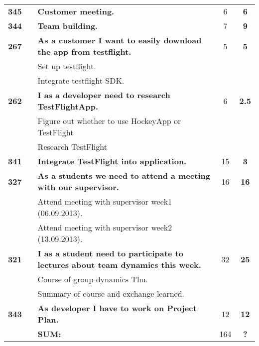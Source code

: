 \begin{longtable}{ccXcc}
		
\midrule
				

\textbf{345} 	&& {\bf Customer meeting.} 	& 		6	& \textbf{6} \\

\textbf{344} 	&& {\bf Team building.} 	& 		7	& \textbf{9} \\
				
			
\textbf{267} 	&& {\bf As a customer I want to easily download the app from testflight. } 	& 		5	& \textbf{5} \\
				&& Set up testflight.	&  &  \\
				&& Integrate testflight SDK. &  &  \\

\textbf{262} 	&& {\bf I as a developer need to research TestFlightApp. } 	& 		6	& \textbf{2.5} \\
				&& Figure out whether to use HockeyApp or TestFlight&  &  \\
				&& Research TestFlight	&  &  \\

\textbf{341} 	&& {\bf Integrate TestFlight into application. } 	& 		15	& \textbf{3} \\

		
\textbf{327} 	&& {\bf As a students we need to attend a meeting with our supervisor. } 	& 		16	& \textbf{16} \\
				&& Attend meeting with supervisor week1 (06.09.2013).	&  &  \\
				&& Attend meeting with supervisor week2 (13.09.2013).	&  &  \\

\midrule
\textbf{321} 	&& {\bf I as a student need to participate to lectures about team dynamics this week. } 	& 		32	& \textbf{25} \\
				&& Course of group dynamics Thu.	&  &  \\
				&& Summary of course and exchange learned.	&  &  \\
				
\textbf{343} 	&& {\bf As developer I have to work on Project Plan.} 	& 		12	& \textbf{12} \\
				
\hline
				&& \textbf{SUM:}		&		164	& \textbf{?}
 \\																			
\bottomrule[1mm]
\end{longtable}
